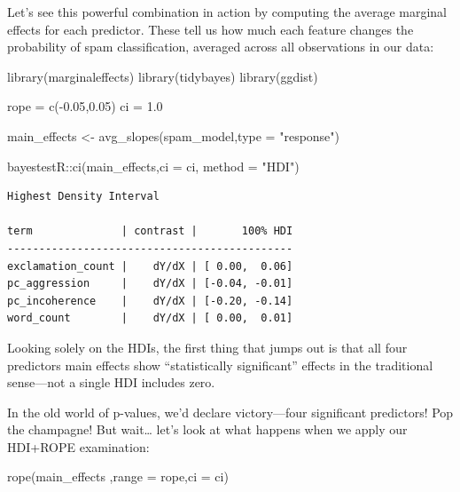 \documentclass[
  letterpaper,
  DIV=11,
  numbers=noendperiod]{scrartcl}
\newenvironment{Shaded}{\begin{snugshade}}{\end{snugshade}}
\newcommand{\AttributeTok}[1]{\textcolor[rgb]{0.40,0.45,0.13}{#1}}
\newcommand{\FloatTok}[1]{\textcolor[rgb]{0.68,0.00,0.00}{#1}}
\newcommand{\FunctionTok}[1]{\textcolor[rgb]{0.28,0.35,0.67}{#1}}
\newcommand{\NormalTok}[1]{\textcolor[rgb]{0.00,0.23,0.31}{#1}}
\newcommand{\OtherTok}[1]{\textcolor[rgb]{0.00,0.23,0.31}{#1}}
\newcommand{\SpecialCharTok}[1]{\textcolor[rgb]{0.37,0.37,0.37}{#1}}
\newcommand{\StringTok}[1]{\textcolor[rgb]{0.13,0.47,0.30}{#1}}
\begin{document}
Let's see this powerful combination in action by computing the average
marginal effects for each predictor. These tell us how much each feature
changes the probability of spam classification, averaged across all
observations in our data:

\begin{Shaded}
\begin{Highlighting}[]
\FunctionTok{library}\NormalTok{(marginaleffects)}
\FunctionTok{library}\NormalTok{(tidybayes)}
\FunctionTok{library}\NormalTok{(ggdist)}

\NormalTok{rope }\OtherTok{=} \FunctionTok{c}\NormalTok{(}\SpecialCharTok{{-}}\FloatTok{0.05}\NormalTok{,}\FloatTok{0.05}\NormalTok{)}
\NormalTok{ci  }\OtherTok{=} \FloatTok{1.0}

\NormalTok{main\_effects }\OtherTok{\textless{}{-}} \FunctionTok{avg\_slopes}\NormalTok{(spam\_model,}\AttributeTok{type =} \StringTok{"response"}\NormalTok{)}

\NormalTok{bayestestR}\SpecialCharTok{::}\FunctionTok{ci}\NormalTok{(main\_effects,}\AttributeTok{ci =}\NormalTok{ ci, }\AttributeTok{method =} \StringTok{"HDI"}\NormalTok{)}
\end{Highlighting}
\end{Shaded}

\begin{verbatim}
Highest Density Interval

term              | contrast |       100% HDI
---------------------------------------------
exclamation_count |    dY/dX | [ 0.00,  0.06]
pc_aggression     |    dY/dX | [-0.04, -0.01]
pc_incoherence    |    dY/dX | [-0.20, -0.14]
word_count        |    dY/dX | [ 0.00,  0.01]
\end{verbatim}

Looking solely on the HDIs, the first thing that jumps out is that all
four predictors main effects show ``statistically significant'' effects
in the traditional sense---not a single HDI includes zero.

In the old world of p-values, we'd declare victory---four significant
predictors! Pop the champagne! But wait\ldots{} let's look at what
happens when we apply our HDI+ROPE examination:

\begin{Shaded}
\begin{Highlighting}[]
\FunctionTok{rope}\NormalTok{(main\_effects ,}\AttributeTok{range =}\NormalTok{ rope,}\AttributeTok{ci =}\NormalTok{ ci)}
\end{Highlighting}
\end{Shaded}
\end{document}
